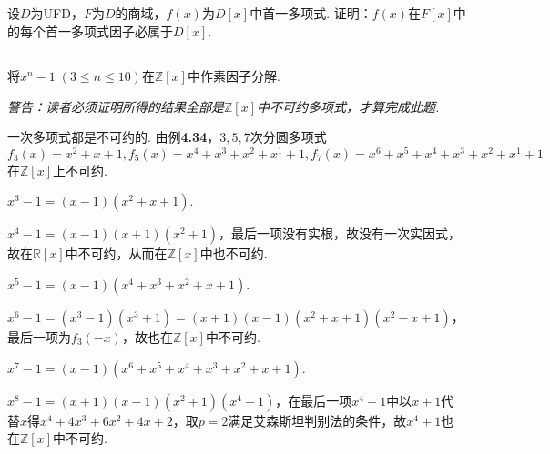 
\subsection{}
设$D$为UFD，$F$为$D$的商域，$f(x)$为$D[x]$中首一多项式. 证明：$f(x)$在$F[x]$中的每个首一多项式因子必属于$D[x]$.


\subsection{}
将$x^n-1\;(3\leq n\leq 10)$在$\mathbb{Z}[x]$中作素因子分解.

\emph{警告：读者必须证明所得的结果全部是$\mathbb{Z}[x]$中不可约多项式，才算完成此题.}

\jie 一次多项式都是不可约的. 由{\heiti 例}\textbf{4.34}，$3,5,7$次分圆多项式$f_3(x)=x^2+x+1, f_5(x)=x^4+x^3+x^2+x^1+1, f_7(x)=x^6+x^5+x^4+x^3+x^2+x^1+1$在$\mathbb{Z}[x]$上不可约.

$x^3-1=(x-1)(x^2+x+1)$.

$x^4-1=(x-1)(x+1)(x^2+1)$，最后一项没有实根，故没有一次实因式，故在$\mathbb{R}[x]$中不可约，从而在$\mathbb{Z}[x]$中也不可约.

$x^5-1=(x-1)(x^4+x^3+x^2+x+1)$.

$x^6-1=(x^3-1)(x^3+1)=(x+1)(x-1)(x^2+x+1)(x^2-x+1)$，最后一项为$f_3(-x)$，故也在$\mathbb{Z}[x]$中不可约.

$x^7-1=(x-1)(x^6+x^5+x^4+x^3+x^2+x+1)$.

$x^8-1=(x+1)(x-1)(x^2+1)(x^4+1)$，在最后一项$x^4+1$中以$x+1$代替$x$得$x^4+4x^3+6x^2+4x+2$，取$p=2$满足艾森斯坦判别法的条件，故$x^4+1$也在$\mathbb{Z}[x]$中不可约.

